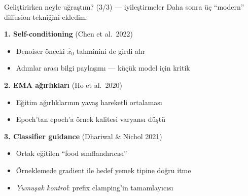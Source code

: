 \documentclass[10pt,aspectratio=169]{beamer}
\begin{document}
\begin{frame}{Geliştirirken neyle uğraştım? (3/3) --- iyileştirmeler}
  Daha sonra üç ``modern'' diffusion tekniğini ekledim:
  \vspace{0.3em}

  \textbf{1. Self-conditioning} (Chen et al.\ 2022)
  \begin{itemize}
    \item Denoiser önceki $\hat x_0$ tahminini de girdi alır
    \item Adımlar arası bilgi paylaşımı --- küçük model için kritik
  \end{itemize}

  \textbf{2. EMA ağırlıkları} (Ho et al.\ 2020)
  \begin{itemize}
    \item Eğitim ağırlıklarının yavaş hareketli ortalaması
    \item Epoch'tan epoch'a örnek kalitesi varyansı düştü
  \end{itemize}

  \textbf{3. Classifier guidance} (Dhariwal \& Nichol 2021)
  \begin{itemize}
    \item Ortak eğitilen ``food sınıflandırıcısı''
    \item Örneklemede gradient ile hedef yemek tipine doğru itme
    \item \emph{Yumuşak kontrol}: prefix clamping'in tamamlayıcısı
  \end{itemize}
\end{frame}
\end{document}

